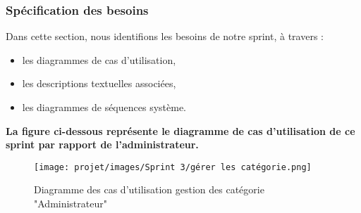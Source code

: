 \subsubsection{Spécification des besoins}
Dans cette section, nous identifions les besoins de notre  sprint, à travers :
\begin{itemize}
    \item les diagrammes de cas d’utilisation,
    \item les descriptions textuelles associées,
    \item les diagrammes de séquences système.
\end{itemize}

\textbf {La figure ci-dessous représente le diagramme de cas d’utilisation de ce sprint par rapport de l'administrateur.}
\begin{figure}[H]
    \centering
    \texttt{[image: projet/images/Sprint 3/gérer les catégorie.png]}
    \caption{Diagramme des cas d’utilisation gestion des catégorie "Administrateur" }
    \label{fig:Adminee }
\end{figure}

